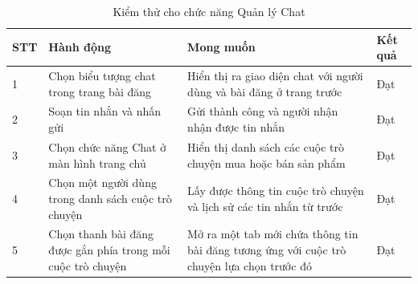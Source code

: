 \documentclass[../DoAn.tex]{subfiles}
\begin{document}
\begin{table}[H]
\centering
\begin{tabular}{|p{1cm}|p{5cm}|p{6cm}|p{1.5cm}|}
\hline
STT & Hành động                                                   & Mong muốn                                                                                 & Kết quả \\ \hline
1   & Chọn biểu tượng chat trong trang bài đăng                   & Hiển thị ra giao diện chat với người dùng và bài đăng ở trang trước                       & Đạt     \\ \hline
2   & Soạn tin nhắn và nhấn gửi                                   & Gửi thành công và người nhận nhận được tin nhắn                                           & Đạt     \\ \hline
3   & Chọn chức năng Chat ở màn hình trang chủ                    & Hiển thị danh sách các cuộc trò chuyện mua hoặc bán sản phẩm                              & Đạt     \\ \hline
4   & Chọn một người dùng trong danh sách cuộc trò chuyện         & Lấy được thông tin cuộc trò chuyện và lịch sử các tin nhắn từ trước                       & Đạt     \\ \hline
5   & Chọn thanh bài đăng được gắn phía trong mỗi cuộc trò chuyện & Mở ra một tab mới chứa thông tin bài đăng tương ứng với cuộc trò chuyện lựa chọn trước đó & Đạt     \\ \hline
\end{tabular}
\caption{Kiểm thử cho chức năng Quản lý Chat}
\label{tab:my-table}
\end{table}
\end{document}

